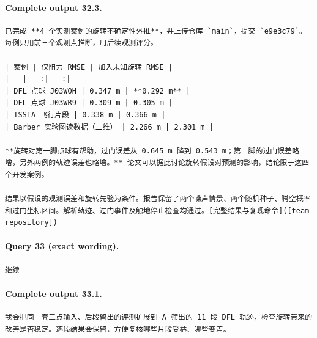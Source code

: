 \documentclass[UTF8,10pt]{ctexart}
\begin{document}
\paragraph{Complete output 32.3.}
\begin{Verbatim}[breaklines=true,breakanywhere=true,fontsize=\scriptsize,frame=single,framesep=2pt]
已完成 **4 个实测案例的旋转不确定性外推**，并上传仓库 `main`，提交 `e9e3c79`。每例只用前三个观测点推断，用后续观测评分。

| 案例 | 仅阻力 RMSE | 加入未知旋转 RMSE |
|---|---:|---:|
| DFL 点球 J03WOH | 0.347 m | **0.292 m** |
| DFL 点球 J03WR9 | 0.309 m | 0.305 m |
| ISSIA 飞行片段 | 0.338 m | 0.366 m |
| Barber 实验图读数据（二维） | 2.266 m | 2.301 m |

**旋转对第一脚点球有帮助，过门误差从 0.645 m 降到 0.543 m；第二脚的过门误差略增，另外两例的轨迹误差也略增。** 论文可以据此讨论旋转假设对预测的影响，结论限于这四个开发案例。

结果以假设的观测误差和旋转先验为条件。报告保留了两个噪声情景、两个随机种子、腾空概率和过门坐标区间。解析轨迹、过门事件及触地停止检查均通过。[完整结果与复现命令]([team repository])
\end{Verbatim}

\paragraph{Query 33 (exact wording).}
\begin{Verbatim}[breaklines=true,breakanywhere=true,fontsize=\scriptsize,frame=single,framesep=2pt]
继续
\end{Verbatim}

\paragraph{Complete output 33.1.}
\begin{Verbatim}[breaklines=true,breakanywhere=true,fontsize=\scriptsize,frame=single,framesep=2pt]
我会把同一套三点输入、后段留出的评测扩展到 A 筛出的 11 段 DFL 轨迹，检查旋转带来的改善是否稳定。逐段结果会保留，方便复核哪些片段受益、哪些变差。
\end{Verbatim}
\end{document}
